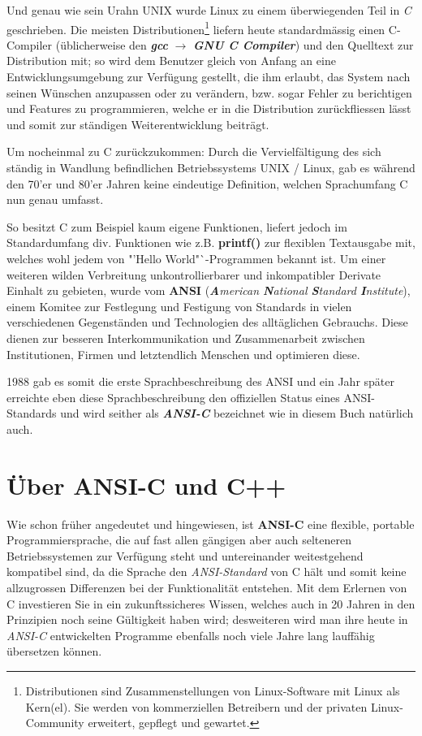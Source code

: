 \documentclass[b5paper,10pt,dvips,fleqn,titlepage,twoside]{book}
\begin{document}
Und genau wie sein Urahn UNIX wurde Linux zu einem überwiegenden Teil in \emph{C} geschrieben.
Die meisten Distributionen\footnote{Distributionen sind Zusammenstellungen von Linux-Software mit Linux als Kern(el). Sie werden von kommerziellen Betreibern und der privaten Linux-Community erweitert, gepflegt und gewartet.} liefern heute standardmässig einen C-Compiler (üblicherweise den \emph{\textbf{gcc}} $\rightarrow$ \emph{\textbf{GNU C Compiler}}) und den Quelltext zur Distribution mit; so wird dem Benutzer gleich von Anfang an eine Entwicklungsumgebung zur Verfügung gestellt, die ihm erlaubt, das System nach seinen Wünschen anzupassen oder zu verändern, bzw. sogar Fehler zu berichtigen und Features zu programmieren, welche er in die Distribution zurückfliessen lässt und somit zur ständigen Weiterentwicklung beiträgt.

Um nocheinmal zu C zurückzukommen: Durch die Vervielfältigung des sich ständig in Wandlung befindlichen Betriebssystems UNIX / Linux, gab es während den 70'er und 80'er Jahren keine eindeutige Definition, welchen Sprachumfang C nun genau umfasst.

So besitzt C zum Beispiel kaum eigene Funktionen, liefert jedoch im Standardumfang div. Funktionen wie z.B. \textbf{printf()} zur flexiblen Textausgabe mit, welches wohl jedem von "'Hello World"`-Programmen bekannt ist.
Um einer weiteren wilden Verbreitung unkontrollierbarer und inkompatibler Derivate Einhalt zu gebieten, wurde vom \textbf{ANSI} (\emph{\textbf{A}merican \textbf{N}ational \textbf{S}tandard \textbf{I}nstitute}), einem Komitee zur Festlegung und Festigung von Standards in vielen verschiedenen Gegenständen und Technologien des alltäglichen Gebrauchs. Diese dienen zur besseren Interkommunikation und Zusammenarbeit zwischen Institutionen, Firmen und letztendlich Menschen und optimieren diese.

1988 gab es somit die erste Sprachbeschreibung des ANSI und ein Jahr später erreichte eben diese Sprachbeschreibung den offiziellen Status eines ANSI-Standards und wird seither als \textbf{\emph{ANSI-C}} bezeichnet \lbrack wie in diesem Buch natürlich auch.\rbrack
\newline
\section{Über ANSI-C und C++}
Wie schon früher angedeutet und hingewiesen, ist \textbf{ANSI-C} eine flexible, portable Programmiersprache, die auf fast allen gängigen aber auch selteneren Betriebssystemen zur Verfügung steht und untereinander weitestgehend kompatibel sind, da die Sprache den \emph{ANSI-Standard} von C hält und somit keine allzugrossen Differenzen bei der Funktionalität entstehen.
Mit dem Erlernen von C investieren Sie in ein zukunftssicheres Wissen, welches auch in 20 Jahren in den Prinzipien noch seine Gültigkeit haben wird; desweiteren wird man ihre heute in \emph{ANSI-C} entwickelten Programme ebenfalls noch viele Jahre lang lauffähig übersetzen können.
\end{document}
